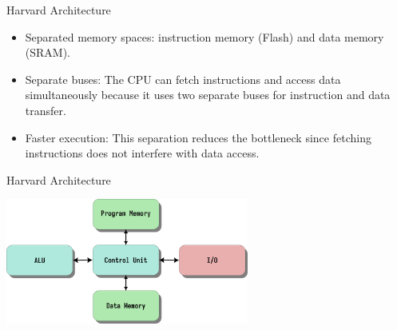 \documentclass[aspectratio=169]{beamer}
\begin{document}
\begin{frame}{Harvard Architecture}
  \begin{itemize}
      \item <1-> Separated memory spaces: instruction memory (Flash) and data memory (SRAM).
      \item <2-> Separate buses: The CPU can fetch instructions and access data simultaneously because it uses two separate buses for instruction and data transfer.
      \item <3-> Faster execution: This separation reduces the bottleneck since fetching instructions does not interfere with data access.
  \end{itemize}
\end{frame}

\begin{frame}{Harvard Architecture}
\begin{center}
  \includegraphics[width=0.6\textwidth]{assets/harvard_arch.png}  
\end{center}
\end{frame}
\end{document}
